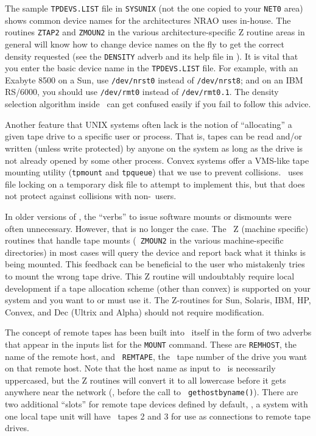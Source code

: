 The sample {\tt TPDEVS.LIST} file in {\tt\dol SYSUNIX} (not the one copied
to your {\tt\dol NET0} area) shows common device names for the
architectures NRAO uses in-house.  The \AIPS routines {\tt ZTAP2} and
{\tt ZMOUN2} in the various architecture-specific Z routine areas in
general will know how to change device names on the fly to get the
correct density requested (see the {\tt DENSITY} adverb and its help
file in \ttaips).  It is vital that you enter the basic device name in
the {\tt TPDEVS.LIST} file.  For example, with an Exabyte 8500 on a Sun,
use {\tt /dev/nrst0} instead of {\tt /dev/nrst8}; and on an IBM RS/6000,
you should use {\tt /dev/rmt0} instead of {\tt /dev/rmt0.1}.  The
density selection algorithm inside \AIPS\ can get confused easily if you
fail to follow this advice.

Another feature that UNIX systems often lack is the notion of
``allocating'' a given tape drive to a specific user or process.  That
is, tapes can be read and/or written (unless write protected) by
anyone on the system as long as the drive is not already opened by
some other process.  Convex systems offer a VMS-like tape mounting
utility ({\tt tpmount} and {\tt tpqueue}) that we use to prevent
collisions.  \ttaips\ uses file locking on a temporary disk file to
attempt to implement this, but that does not protect against
collisions with non-\ttaips\ users.

In older versions of \AIPS, the ``verbs'' to issue software mounts or
dismounts were often unnecessary.  However, that is no longer the case.
The \AIPS\ Z (machine specific) routines that handle tape mounts ({\tt
ZMOUN2} in the various machine-specific directories) in most cases will
query the device and report back what it thinks is being mounted.  This
feedback can be beneficial to the user who mistakenly tries to mount the
wrong tape drive.  This Z routine will undoubtably require local
development if a tape allocation scheme (other than convex) is supported
on your system and you want to or must use it.  The Z-routines for Sun,
Solaris, IBM, HP, Convex, and Dec (Ultrix and Alpha) should not require
modification.
\medskip


The concept of remote tapes has been built into \AIPS\ itself in the
form of two adverbs that appear in the inputs list for the {\tt MOUNT}
command.  These are {\tt REMHOST}, the name of the remote host, and {\tt
REMTAPE}, the \AIPS\ tape number of the drive you want on that remote
host.  Note that the host name as input to \AIPS\ is necessarily
uppercased, but the Z routines will convert it to all lowercase before
it gets anywhere near the network (\ie, before the call to {\tt
gethostbyname()}).  There are two additional ``slots'' for remote tape
devices defined by default, \eg, a system with one local tape unit will
have \AIPS\ tapes 2 and 3 for use as connections to remote tape drives.

